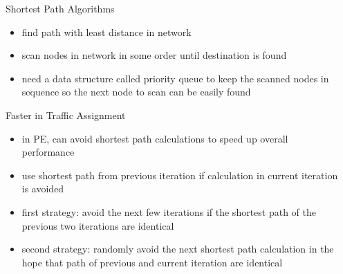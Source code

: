 \documentclass[final]{beamer}
\begin{document}
\begin{frame}{ }
\begin{columns}[t]
\begin{column}{.26\linewidth}
            \begin{block}{Shortest Path Algorithms}
                \begin{itemize}
                    \itemsep.5em
                    \item find path with least distance in network
                    \item scan nodes in network in some order until destination is found
                    \item need a data structure called \alert{priority queue} to keep the scanned nodes in sequence so the next node to scan can be easily found
                \end{itemize}
            \end{block}

            \hspace{25em}

            \begin{block}{Faster in Traffic Assignment}
                \begin{itemize}
                    \itemsep.5em
                    \item in PE, can \alert{avoid} shortest path calculations to speed up overall performance
                    \item use shortest path from previous iteration if calculation in current iteration is avoided
                    \item first strategy: avoid the \alert{next few} iterations if the shortest path of the \alert{previous two} iterations are \alert{identical}
                    \item second strategy: \alert{randomly avoid} the next shortest path calculation in the hope that path of \alert{previous and current} iteration are \alert{identical}
                \end{itemize}
            \end{block}

        \end{column}
        \begin{column}{.4\linewidth}


\end{column}
\end{columns}
\end{frame}
\end{document}
